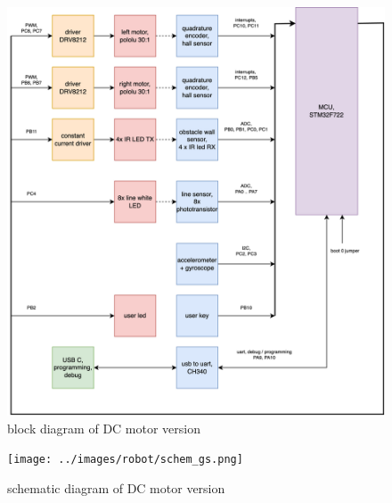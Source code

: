 \documentclass[12pt,twoside,onecolumn,openany,extrafontsizes,dvipsnames]{memoir}
\begin{document}
    \newpage
    \begin{figure}[h]
        \centering
        \includegraphics[scale=0.8]{../diagrams/sw/sw-block_dc.png}
        \caption{block diagram of DC motor version}
    \end{figure}

    \newpage
    \begin{figure}[h]
        \centering
        \texttt{[image: ../images/robot/schem\_gs.png]}
        \caption{schematic diagram of DC motor version}
    \end{figure}

    \newpage
\end{document}
